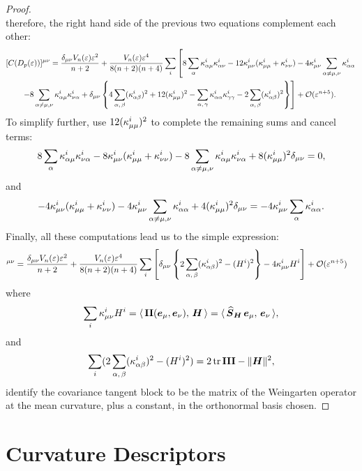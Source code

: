\documentclass[letterpaper, reqno, 11pt]{amsart}
\theoremstyle{definition}
\theoremstyle{remark}
\numberwithin{equation}{section}
\begin{document}
\begin{proof}
$$$$
therefore, the right hand side of the previous two equations complement each other:
\begin{align*}
& [C(D_p(\varepsilon))]^{\mu\nu} = \frac{\delta_{\mu\nu}V_n(\varepsilon)\varepsilon^2}{n+2} + \frac{V_n(\varepsilon)\varepsilon^{4}}{8(n+2)(n+4)} \sum_{i}\left[ 8\sum_{\alpha}\kappa^i_{\alpha\mu}\kappa^i_{\alpha\nu} - 12\kappa^i_{\mu\nu}(\kappa^i_{\mu\mu}+\kappa^i_{\nu\nu}) - 4\kappa^i_{\mu\nu}\sum_{\alpha\neq\mu,\nu}\kappa^i_{\alpha\alpha}  \right. \\
&\qquad \left. - 8\sum_{\alpha\neq\mu,\nu}\kappa^i_{\alpha\mu}\kappa^i_{\nu\alpha} + \delta_{\mu\nu}\left\{ 4\sum_{\alpha,\,\beta}(\kappa^i_{\alpha\beta})^2 + 12(\kappa^i_{\mu\mu})^2 -\sum_{\alpha,\,\gamma}\kappa^i_{\alpha\alpha}\kappa^i_{\gamma\gamma} -2\sum_{\alpha,\,\beta}(\kappa^i_{\alpha\beta})^2 \right\}\right] +{\mathcal O}(\varepsilon^{n+5}).
\end{align*}
To simplify further, use $12(\kappa^i_{\mu\mu})^2$ to complete the remaining sums and cancel terms:
$$
8\sum_{\alpha}\kappa^i_{\alpha\mu}\kappa^i_{\nu\alpha} - 8\kappa^i_{\mu\nu}(\kappa^i_{\mu\mu}+\kappa^i_{\nu\nu}) -8\sum_{\alpha\neq\mu,\nu}\kappa^i_{\alpha\mu}\kappa^i_{\nu\alpha} + 8(\kappa^i_{\mu\mu})^2\delta_{\mu\nu} = 0,
$$
and
$$
- 4\kappa^i_{\mu\nu}(\kappa^i_{\mu\mu}+\kappa^i_{\nu\nu}) -4\kappa^i_{\mu\nu}\sum_{\alpha\neq\mu,\nu}\kappa^i_{\alpha\alpha} + 4(\kappa^i_{\mu\mu})^2\delta_{\mu\nu} = -4\kappa^i_{\mu\nu}\sum_{\alpha}\kappa^i_{\alpha\alpha}. 
$$
Finally, all these computations lead us to the simple expression:
\begin{align*}
[C(D_p(\vep))]^{\mu\nu} & = \frac{\del_{\mu\nu}V_n(\vep)\vep^2}{n+2} + \frac{V_n(\vep)\vep^{4}}{8(n+2)(n+4)} \sum_{i}\left[\del_{\mu\nu}\left\{ 2\sum_{\al,\,\bet}(\ka^i_{\al\bet})^2 - (H^i)^2  \right\}-4\ka^i_{\mu\nu}H^i \right]+\cO(\vep^{n+5})
\end{align*}
where 
$$\sum_i\kappa^i_{\mu\nu}H^i = \langle\, {\boldsymbol{\mathrm{II}}(\boldsymbol{e}_\mu,\boldsymbol{e}_\nu)},\,{\boldsymbol{H}}\,\rangle=\langle\, {\boldsymbol{\widehat{S}}_{\boldsymbol{H}}\,\boldsymbol{e}_\mu},\,{\boldsymbol{e}_\nu}\,\rangle,$$
and 
$$\sum_i(2\sum_{\alpha,\,\beta}(\kappa^i_{\alpha\beta})^2 - (H^i)^2)=2\,\mathrm{tr}\,\boldsymbol{\mathrm{III}} -\|\boldsymbol{H}\|^2,$$ 
identify the covariance tangent block to be the matrix of the Weingarten operator at the mean curvature, plus a constant, in the orthonormal basis chosen.
\end{proof}




\section{Curvature Descriptors}\label{sec:descrip}
\end{document}
